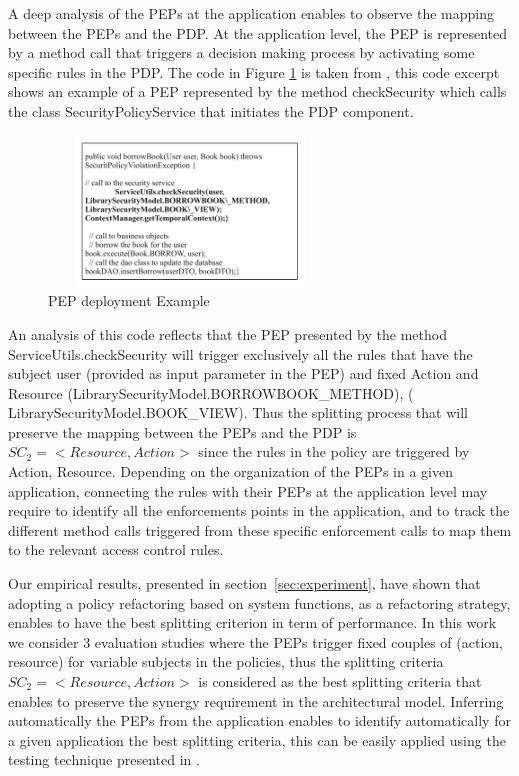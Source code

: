 A deep analysis of the PEPs at the application enables to observe the mapping between the PEPs and the PDP. At the application level, the PEP
is represented by a method call that triggers a decision making process by activating some specific rules in the PDP.
The code in Figure \ref{PEP deployment Example} is taken from \cite{legacy}, this code excerpt shows an example of a PEP represented by the method checkSecurity which calls the class 
SecurityPolicyService that initiates the PDP component.
\begin{figure}[!h]
\begin{center}
\includegraphics[width=7.5cm, height=4cm]{PEPExample}
\caption{PEP deployment Example}
\label{PEP deployment Example}
\end{center}
\end{figure}

An analysis of this code reflects that the PEP presented by the method ServiceUtils.checkSecurity will trigger exclusively all the rules 
that have the subject user (provided as input parameter in the PEP) and fixed Action and Resource (LibrarySecurityModel.BORROWBOOK\_METHOD), ( LibrarySecurityModel.BOOK\_VIEW).
Thus the splitting process that will preserve the mapping between the PEPs and the PDP is $SC_{2}=<Resource,Action>$ since the rules in the policy are triggered 
by Action, Resource. Depending on the organization of the PEPs in a given application, connecting the rules with their PEPs at the application level may require to identify
 all the enforcements points in the application, and to track the different method calls triggered from these specific enforcement calls to map them to the relevant access control rules.

Our empirical results, presented in section~\ref{sec:experiment}, have shown that adopting a policy refactoring based on system functions, as a refactoring strategy, enables to 
have the best splitting criterion in term of performance. 
In this work we consider 3 evaluation studies where the PEPs trigger fixed couples of (action, resource) for variable subjects in the policies, thus the splitting criteria $SC_{2}=<Resource,Action>$ is considered as 
the best splitting criteria that enables to preserve the synergy requirement in the architectural model. Inferring automatically the PEPs from the application enables to identify automatically
 for a given application the best splitting criteria, this can be easily applied using the testing technique presented in \cite{legacy}.

